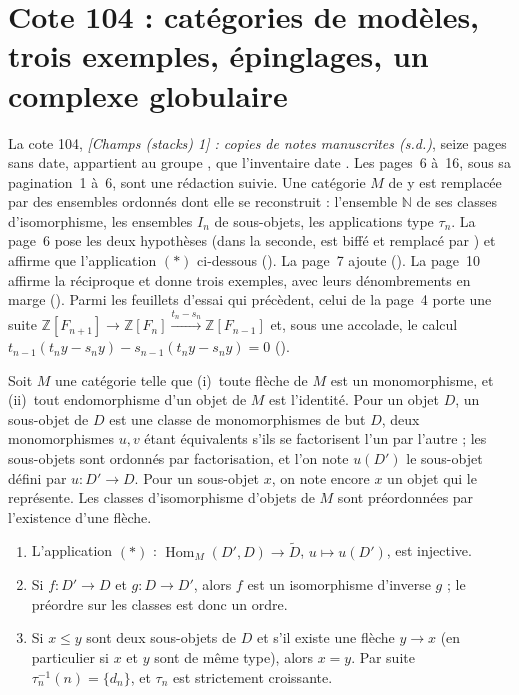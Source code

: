 \section[Cote 104 : catégories de modèles, trois exemples, épinglages, un complexe globulaire]{Cote 104 : catégories de modèles, trois exemples, épinglages, un complexe globulaire\protect{}}\label{sec:104}

La cote 104, \emph{[Champs (stacks) 1] : copies de notes manuscrites (s.d.)}, seize pages sans date, appartient au groupe , que l'inventaire date . Les pages~6 à~16, sous sa pagination~1 à~6, sont une rédaction suivie. Une catégorie $M$ de  y est remplacée par des ensembles ordonnés dont elle se reconstruit : l'ensemble $\mathbb N$ de ses classes d'isomorphisme, les ensembles $I_n$ de sous-objets, les applications type $\tau_n$. La page~6 pose les deux hypothèses (dans la seconde,  est biffé et remplacé par ) et affirme que l'application $(*)$ ci-dessous  (\mbox{}). La page~7 ajoute  (). La page~10 affirme la réciproque et donne trois exemples, avec leurs dénombrements en marge (). Parmi les feuillets d'essai qui précèdent, celui de la page~4 porte une suite $\mathbb Z[F_{n+1}] \to \mathbb Z[F_n] \xrightarrow{t_n - s_n} \mathbb Z[F_{n-1}]$ et, sous une accolade, le calcul $t_{n-1}(t_n y - s_n y) - s_{n-1}(t_n y - s_n y) = 0$ ().

\begin{definition}
Soit $M$ une catégorie telle que (i)~toute flèche de $M$ est un monomorphisme, et (ii)~tout endomorphisme d'un objet de $M$ est l'identité. Pour un objet $D$, un sous-objet de $D$ est une classe de monomorphismes de but $D$, deux monomorphismes $u, v$ étant équivalents s'ils se factorisent l'un par l'autre ; les sous-objets sont ordonnés par factorisation, et l'on note $u(D')$ le sous-objet défini par $u : D' \to D$. Pour un sous-objet $x$, on note encore $x$ un objet qui le représente. Les classes d'isomorphisme d'objets de $M$ sont préordonnées par l'existence d'une flèche.
\end{definition}

\begin{enonce}[Pages 6 et 7]
\begin{enumerate}
\item L'application $(*)$ : $\operatorname{Hom}_M(D', D) \to \widetilde D$, $u \mapsto u(D')$, est injective.
\item Si $f : D' \to D$ et $g : D \to D'$, alors $f$ est un isomorphisme d'inverse $g$ ; le préordre sur les classes est donc un ordre.
\item Si $x \leq y$ sont deux sous-objets de $D$ et s'il existe une flèche $y \to x$ (en particulier si $x$ et $y$ sont de même type), alors $x = y$. Par suite $\tau_n^{-1}(n) = \{d_n\}$, et $\tau_n$ est strictement croissante.
\end{enumerate}
\end{enonce}

